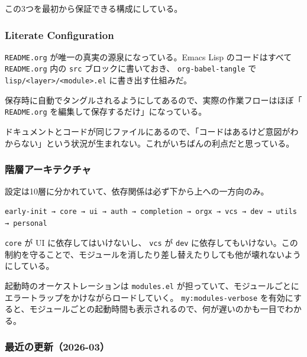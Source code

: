 \documentclass[11pt]{article}
\begin{document}
この3つを最初から保証できる構成にしている。
\subsubsection{Literate Configuration}
\label{sec:org1f592c9}

\texttt{README.org} が唯一の真実の源泉になっている。Emacs Lisp のコードはすべて \texttt{README.org} 内の \texttt{src} ブロックに書いておき、 \texttt{org-babel-tangle} で \texttt{lisp/<layer>/<module>.el} に書き出す仕組みだ。

保存時に自動でタングルされるようにしてあるので、実際の作業フローはほぼ「 \texttt{README.org} を編集して保存するだけ」になっている。

ドキュメントとコードが同じファイルにあるので、「コードはあるけど意図がわからない」という状況が生まれない。これがいちばんの利点だと思っている。
\subsubsection{階層アーキテクチャ}
\label{sec:org0b8a656}

設定は10層に分かれていて、依存関係は必ず下から上への一方向のみ。

\begin{verbatim}
early-init → core → ui → auth → completion → orgx → vcs → dev → utils → personal
\end{verbatim}

\texttt{core} が UI に依存してはいけないし、 \texttt{vcs} が \texttt{dev} に依存してもいけない。この制約を守ることで、モジュールを消したり差し替えたりしても他が壊れないようにしている。

起動時のオーケストレーションは \texttt{modules.el} が担っていて、モジュールごとにエラートラップをかけながらロードしていく。 \texttt{my:modules-verbose} を有効にすると、モジュールごとの起動時間も表示されるので、何が遅いのかも一目でわかる。
\subsubsection{最近の更新（2026-03）}
\label{sec:org4a96cd8}
\end{document}
